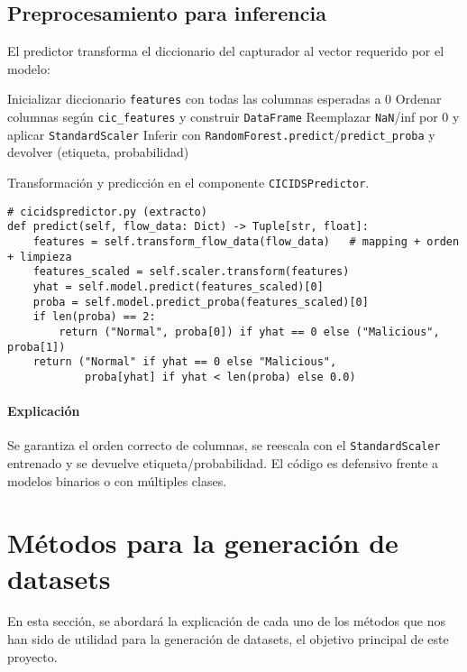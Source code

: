\subsection*{Preprocesamiento para inferencia}
El predictor transforma el diccionario del capturador al vector requerido por el modelo:
\begin{algorithm}[H]
\SetAlgoLined
{}
Inicializar diccionario \texttt{features} con todas las columnas esperadas a 0\;
Ordenar columnas según \texttt{cic\_features} y construir \texttt{DataFrame}\;
Reemplazar \texttt{NaN}/inf por 0 y aplicar \texttt{StandardScaler}\;
Inferir con \texttt{RandomForest.predict}/\texttt{predict\_proba} y devolver (etiqueta, probabilidad)\;
\caption{Transformación y predicción en el componente \texttt{CICIDSPredictor}.}
\label{alg:predictor}
\end{algorithm}

\begin{lstlisting}[style=tfgpython,caption={Transformar y predecir (extracto)},label=List.Predictor]
# cicidspredictor.py (extracto)
def predict(self, flow_data: Dict) -> Tuple[str, float]:
    features = self.transform_flow_data(flow_data)   # mapping + orden + limpieza
    features_scaled = self.scaler.transform(features)
    yhat = self.model.predict(features_scaled)[0]
    proba = self.model.predict_proba(features_scaled)[0]
    if len(proba) == 2:
        return ("Normal", proba[0]) if yhat == 0 else ("Malicious", proba[1])
    return ("Normal" if yhat == 0 else "Malicious",
            proba[yhat] if yhat < len(proba) else 0.0)
\end{lstlisting}

\paragraph{Explicación}
Se garantiza el orden correcto de columnas, se reescala con el \texttt{StandardScaler} entrenado y se devuelve etiqueta/probabilidad. El código es defensivo frente a modelos binarios o con múltiples clases.

\section{Métodos para la generación de datasets}
En esta sección, se abordará la explicación de cada uno de los métodos que nos han sido de utilidad para la generación de datasets, el objetivo principal de este proyecto.

